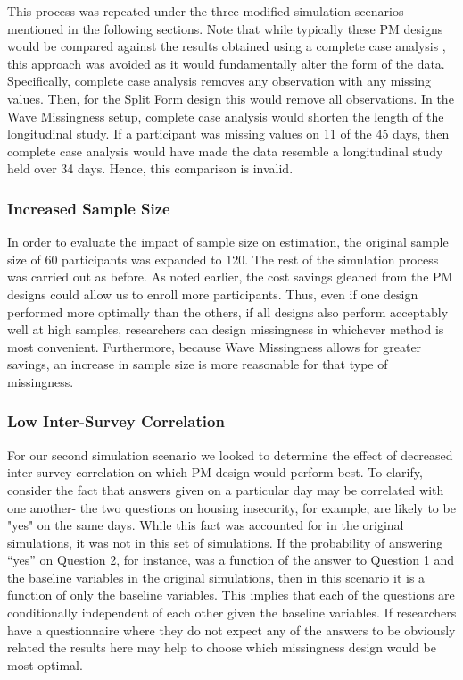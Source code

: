 \documentclass{svjour3}                     %
\begin{document}
This process was repeated under the three modified simulation scenarios mentioned in the following sections. Note that while typically these PM designs would be compared against the results obtained using a complete case analysis \citep{rhemtulla2016asymptotic}, this approach was avoided as it would fundamentally alter the form of the data. Specifically, complete case analysis removes any observation with any missing values. Then, for the Split Form design this would remove all observations. In the Wave Missingness setup, complete case analysis would shorten the length of the longitudinal study. If a participant was missing values on 11 of the 45 days, then complete case analysis would have made the data resemble a longitudinal study held over 34 days. Hence, this comparison is invalid. \par

\subsubsection{Increased Sample Size}
In order to evaluate the impact of sample size on estimation, the original sample size of 60 participants was expanded to 120. The rest of the simulation process was carried out as before. As noted earlier, the cost savings gleaned from the PM designs could allow us to enroll more participants. Thus, even if one design performed more optimally than the others, if all designs also perform acceptably well at high samples, researchers can design missingness in whichever method is most convenient. Furthermore, because Wave Missingness allows for greater savings, an increase in sample size is more reasonable for that type of missingness. \par
\subsubsection{Low Inter-Survey Correlation}
For our second simulation scenario we looked to determine the effect of decreased inter-survey correlation on which PM design would perform best. To clarify, consider the fact that answers given on a particular day may be correlated with one another- the two questions on housing insecurity, for example, are likely to be "yes" on the same days. While this fact was accounted for in the original simulations, it was not in this set of simulations. If the probability of answering “yes” on Question 2, for instance, was a function of the answer to Question 1 and the baseline variables in the original simulations, then in this scenario it is a function of only the baseline variables. This implies that each of the questions are conditionally independent of each other given the baseline variables. If researchers have a questionnaire where they do not expect any of the answers to be obviously related the results here may help to choose which missingness design would be most optimal. \par
\end{document}
